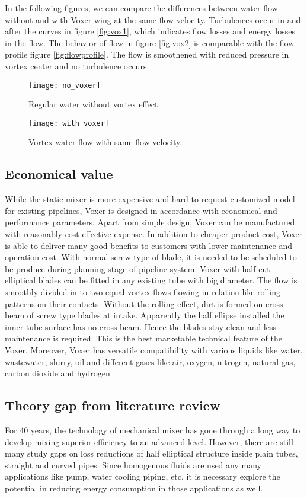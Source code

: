 In the following figures, we can compare the differences between water flow without and with Voxer wing at the same flow velocity. Turbulences occur in and after the curves in figure \vref{fig:vox1}, which indicates flow losses and energy losses in the flow. The behavior of flow in figure \vref{fig:vox2} is comparable with the flow profile figure \vref{fig:flowprofile}. The flow is smoothened with reduced pressure in vortex center and no turbulence occurs.
\begin{figure}[h]
  \centering
  \texttt{[image: no\_voxer]}
  \caption{ Regular water without vortex effect.\cite{voxer:article}}
  \label{fig:vox1}
\end{figure}
\begin{figure}[h]
  \centering
  \texttt{[image: with\_voxer]}
  \caption{ Vortex water flow with same flow velocity.\cite{voxer:article}}
  \label{fig:vox2}
\end{figure}

\subsection{Economical value}

While the static mixer is more expensive and hard to request customized model for existing pipelines, Voxer is designed in accordance with economical and performance parameters. Apart from simple design, Voxer can be manufactured with reasonably cost-effective expense. In addition to cheaper product cost, Voxer is able to deliver many good benefits to customers with lower maintenance and operation cost.
With normal screw type of blade, it is needed to be scheduled to be produce during planning stage of pipeline system. Voxer with half cut elliptical blades can be fitted in any existing tube with big diameter. The flow is smoothly divided in to two equal vortex flows flowing in relation like rolling patterns on their contacts. Without the rolling effect, dirt is formed on cross beam of screw type blades at intake. Apparently the half ellipse installed the inner tube surface has no cross beam. Hence the blades stay clean and less maintenance is required. This is the best marketable technical feature of the Voxer. Moreover, Voxer has versatile compatibility with various liquids like water, wastewater, slurry, oil and different gases like air, oxygen, nitrogen, natural gas, carbon dioxide and hydrogen \cite{voxer:article}. 

\subsection{Theory gap from literature review}

For 40 years, the technology of mechanical mixer has gone through a long way to develop mixing superior efficiency to an advanced level. However, there are still many study gaps on loss reductions of half elliptical structure inside plain tubes, straight and curved pipes. Since homogenous fluids are used any many applications like pump, water cooling piping, etc, it is necessary explore the potential in reducing energy consumption in those applications as well.  
\clearpage %
